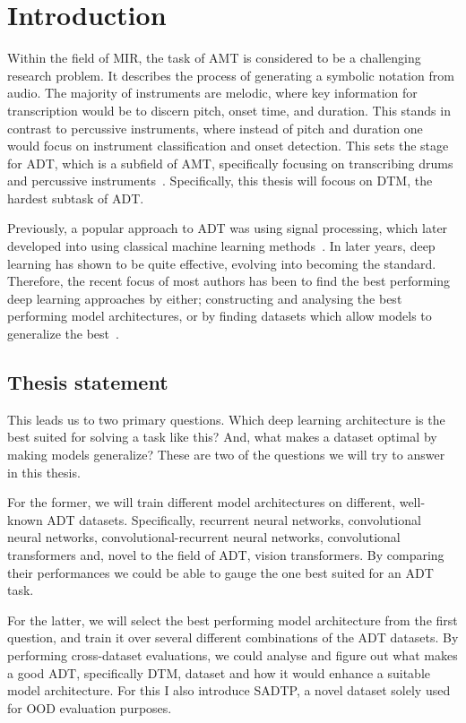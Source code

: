 \chapter{Introduction}

Within the field of \gls{MIR}, the task of \gls{AMT} is considered to be a challenging research problem. It describes the process of generating a symbolic notation from audio. The majority of instruments are melodic, where key information for transcription would be to discern pitch, onset time, and duration. This stands in contrast to percussive instruments, where instead of pitch and duration one would focus on instrument classification and onset detection. This sets the stage for \gls{ADT}, which is a subfield of \gls{AMT}, specifically focusing on transcribing drums and percussive instruments~\cite{8350302}. Specifically, this thesis will focous on \gls{DTM}, the hardest subtask of \gls{ADT}.

Previously, a popular approach to \gls{ADT} was using signal processing, which later developed into using classical machine learning methods~\cite{8350302}. In later years, deep learning has shown to be quite effective, evolving into becoming the standard. Therefore, the recent focus of most authors has been to find the best performing deep learning approaches by either; constructing and analysing the best performing model architectures, or by finding datasets which allow models to generalize the best~\cite{signals4040042}.

\section{Thesis statement}

This leads us to two primary questions. Which deep learning architecture is the best suited for solving a task like this? And, what makes a dataset optimal by making models generalize? These are two of the questions we will try to answer in this thesis. 

For the former, we will train different model architectures on different, well-known \gls{ADT} datasets. Specifically, recurrent neural networks, convolutional neural networks, convolutional-recurrent neural networks, convolutional transformers and, novel to the field of \gls{ADT}, vision transformers. By comparing their performances we could be able to gauge the one best suited for an \gls{ADT} task.

For the latter, we will select the best performing model architecture from the first question, and train it over several different combinations of the \gls{ADT} datasets. By performing cross-dataset evaluations, we could analyse and figure out what makes a good \gls{ADT}, specifically \gls{DTM}, dataset and how it would enhance a suitable model architecture. For this I also introduce SADTP, a novel dataset solely used for \gls{OOD} evaluation purposes.

